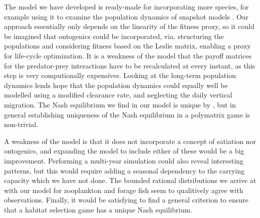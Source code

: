 





The model we have developed is ready-made for incorporating more species, for example using it to examine the population dynamics of snapshot models \citep{pinti2019trophic}. Our approach essentially only depends on the linearity of the fitness proxy, so it could be imagined that ontogenics could be incorporated, via. structuring the populations and considering fitness based on the Leslie matrix, enabling a proxy for life-cycle optimization. It is a weakness of the model that the payoff matrices for the predator-prey interactions have to be recalculated at every instant, as this step is very computionally expensives. Looking at the long-term population dynamics lends hope that the population dynamics could equally well be modelled using a modified clearance rate, and neglecting the daily vertical migration. The Nash equilibrium we find in our model is unique by \citep{verticalmigration}, but in general establishing uniqueness of the Nash equilibrium in a polymatrix game is non-trivial.

A weakness of the model is that it does not incorporate a concept of satiation nor ontogenics, and expanding the model to include either of these would be a big improvement. Performing a multi-year simulation could also reveal interesting patterns, but this would require adding a seasonal dependency to the carrying capacity which we have not done. The bounded rational distributions we arrive at with our model for zooplankton and forage fish seem to qualitively agree with observations. Finally, it would be satisfying to find a general criterion to ensure that a habitat selection game has a unique Nash equilibrium.
